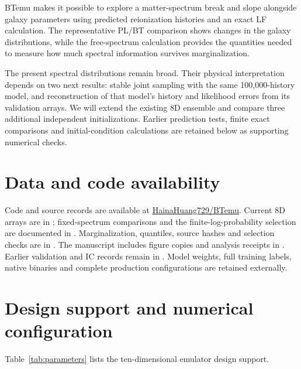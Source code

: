 BTemu makes it possible to explore a matter-spectrum break and slope alongside galaxy parameters using predicted reionization histories and an exact LF calculation. The representative PL/BT comparison shows changes in the galaxy distributions, while the free-spectrum calculation provides the quantities needed to measure how much spectral information survives marginalization.

The present spectral distributions remain broad. Their physical interpretation depends on two next results: stable joint sampling with the same 100,000-history model, and reconstruction of that model's history and likelihood errors from its validation arrays. We will extend the existing 8D ensemble and compare three additional independent initializations. Earlier prediction tests, finite exact comparisons and initial-condition calculations are retained below as supporting numerical checks.

\section*{Data and code availability}

Code and source records are available at \href{https://github.com/HainaHuang729/BTemu}{HainaHuang729/BTemu}. Current 8D arrays are in ; fixed-spectrum comparisons and the finite-log-probability selection are documented in . Marginalization, quantiles, source hashes and selection checks are in . The manuscript includes figure copies and analysis receipts in . Earlier validation and IC records remain in . Model weights, full training labels, native binaries and complete production configurations are retained externally.



\clearpage\appendix
\setcounter{figure}{0}
\setcounter{table}{0}

\section{Design support and numerical configuration}\label{app:configuration}\label{parameter-domain-and-chain-definitions}

Table~\ref{tab:parameters} lists the ten-dimensional emulator design support.

